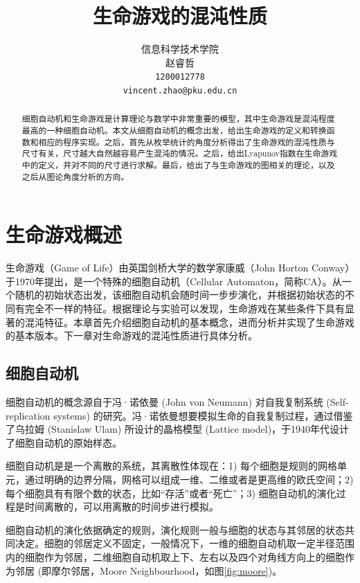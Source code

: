 \documentclass[a4paper,12pt]{article}
\begin{document}
\title{{\huge 生命游戏的混沌性质}}
\author{
	信息科学技术学院\\
	赵睿哲\\
	{\normalsize \texttt{1200012778}}\\
	{\normalsize \texttt{vincent.zhao@pku.edu.cn}}}
\date{}
\maketitle
\onehalfspacing
\begin{abstract}
细胞自动机和生命游戏是计算理论与数学中非常重要的模型，其中生命游戏是混沌程度最高的一种细胞自动机。本文从细胞自动机的概念出发，给出生命游戏的定义和转换函数和相应的程序实现。之后，首先从枚举统计的角度分析得出了生命游戏的混沌性质与尺寸有关，尺寸越大自然越容易产生混沌的情况。之后，给出Lyapunov指数在生命游戏中的定义，并对不同的尺寸进行求解。最后，给出了与生命游戏的图相关的理论，以及之后从图论角度分析的方向。
\end{abstract}

\section{生命游戏概述}

生命游戏（Game of Life）由英国剑桥大学的数学家康威（John Horton Conway）于1970年提出，是一个特殊的细胞自动机（Cellular Automaton，简称CA）。从一个随机的初始状态出发，该细胞自动机会随时间一步步演化，并根据初始状态的不同有完全不一样的特征。根据理论与实验可以发现，生命游戏在某些条件下具有显著的混沌特征。本章首先介绍细胞自动机的基本概念，进而分析并实现了生命游戏的基本版本。下一章对生命游戏的混沌性质进行具体分析。

\subsection{细胞自动机}

细胞自动机的概念源自于冯·诺依曼 (John von Neumann) 对自我复制系统 (Self-replication systems) 的研究。冯·诺依曼想要模拟生命的自我复制过程，通过借鉴了乌拉姆 (Stanislaw Ulam) 所设计的晶格模型 (Lattice model)，于1940年代设计了细胞自动机的原始样态。

细胞自动机是是一个离散的系统，其离散性体现在：1) 每个细胞是规则的网格单元，通过明确的边界分隔，网格可以组成一维、二维或者是更高维的欧氏空间；2) 每个细胞具有有限个数的状态，比如“存活”或者“死亡”；3) 细胞自动机的演化过程是时间离散的，可以用离散的时间步进行模拟。

细胞自动机的演化依据确定的规则，演化规则一般与细胞的状态与其邻居的状态共同决定。细胞的邻居定义不固定，一般情况下，一维的细胞自动机取一定半径范围内的细胞作为邻居，二维细胞自动机取上下、左右以及四个对角线方向上的细胞作为邻居 (即摩尔邻居，Moore Neighbourhood，如图\ref{fig:moore})。
\end{document}
